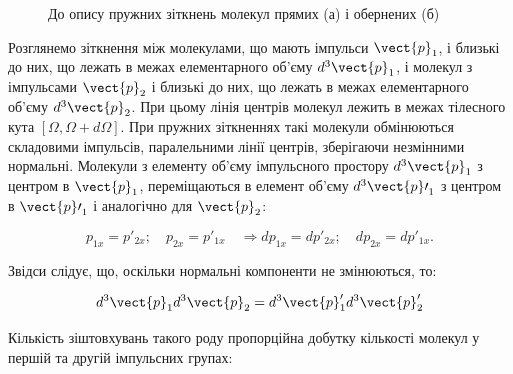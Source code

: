 \begin{figure}[h!]
\begin{subfigure}[t]{0.45\linewidth}
    \caption{}
    \label{}
    \end{subfigure}
    \caption{До опису пружних зіткнень молекул прямих (а) і обернених (б)}
\end{figure}

Розглянемо зіткнення між молекулами, що мають імпульси ${\vect{p}}_1$,  і близькі до них, що лежать в межах елементарного об’єму $d^3{\vect{p}}_1$, і молекул з імпульсами ${\vect{p}}_2$ і близькі до них, що лежать в межах елементарного об'єму $d^3{\vect{p}}_2$. При цьому лінія центрів молекул лежить в межах тілесного кута $[\Omega, \Omega + d\Omega]$. При пружних зіткненнях такі молекули обмінюються складовими імпульсів, паралельними лінії центрів, зберігаючи незмінними нормальні. Молекули з елементу об'єму імпульсного простору $d^3{\vect{p}}_1$ з центром в ${\vect{p}}_1$, переміщаються в елемент об’єму $d^3{\vect{p}\prime}_1$ з центром в ${\vect{p}\prime}_1$ і аналогічно для ${\vect{p}}_2$:

\begin{equation}
p_{1x}=p'_{2x};\quad  p_{2x}=p'_{1x}\quad  \Rightarrow dp_{1x}=dp'_{2x};    \quad dp_{2x}=dp'_{1x}.
\label{eq:134.2}
\end{equation}

Звідси слідує, що, оскільки нормальні компоненти не змінюються, то:

\begin{equation}
d^3\vect{p}_1 d^3\vect{p}_2 = d^3\vect{p}'_1 d^3\vect{p}'_2
\label{eq:134.3}
\end{equation}

Кількість зіштовхувань такого роду пропорційна добутку кількості молекул у першій та другій імпульсних групах:

